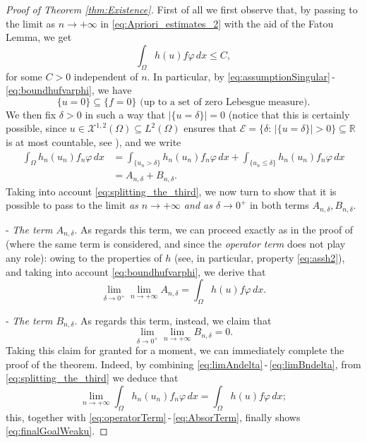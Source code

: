 \documentclass[11pt,a4paper]{amsart}
\theoremstyle{definition}
\theoremstyle{plain}
\numberwithin{equation}{section}
\begin{document}
{\begin{proof}[Proof of Theorem \ref{thm:Existence}]
First of all we first observe that, 
by passing to the limit as $n\to+\infty$ 
in \eqref{eq:Apriori_estimates_2} with the aid of the
Fatou Lemma, we get
\begin{equation} \label{eq:boundhufvarphi}
 \int_{\Omega} h(u)f\varphi\,dx \leq C,
\end{equation}
for some $C > 0$ independent of $n$. In particular, by
\eqref{eq:assumptionSingular}\,-\,\eqref{eq:boundhufvarphi},
 we have
 \begin{equation} \label{eq:inclusionufzero}
  \text{$\{u = 0\}\subseteq \{f = 0\}$ (up to a set of zero Lebesgue measure)}.
  \end{equation}
 We then fix
 $\delta > 0$ in such a way that $|\{u = \delta\}| = 0$
(notice that this is certainly possible, since $u\in \mathcal{X}^{1,2}(\Omega)\subseteq L^2(\Omega)$ ensures that $\mathcal{E} = \{\delta:\,|\{u = \delta\}| > 0\}\subseteq\mathbb{R}$ is at most countable, see \cite[Lemma 2.8]{MonticelliRW}), and we write
\begin{equation}\label{eq:splitting_the_third}
\begin{split}
\int_{\Omega}h_n(u_n)f_n \varphi\,dx & = \int_{\{u_n > \delta\}} h_n(u_n)f_n \varphi\,dx 
+ \int_{\{u_n \leq \delta\}} h_n(u_n)f_n \varphi\,dx\\
& = A_{n,\delta}+B_{n,\delta}.
\end{split}
\end{equation}
Taking into account \eqref{eq:splitting_the_third}, we now turn to show that it is possible
 to pass to the limit \emph{as $n\to+\infty$ and as $\delta\to 0^+$} in both terms
$A_{n,\delta},B_{n,\delta}$.
\medskip

-\,\,\emph{The term $A_{n,\delta}$}. As regards this term,
we can proceed exactly as in the proof
of \cite[Theorem 3.4]{Oliva} (where the same term is considered,
and since the \emph{operator term} does not play any role): owing to the properties of $h$
(see, in particular, property \eqref{eq:assh2}),
and taking into account \eqref{eq:boundhufvarphi}, we derive that
\begin{equation} \label{eq:limAndelta}
 \lim_{\delta\to 0^+}\lim_{n\to+\infty}A_{n,\delta} =
\int_\Omega h(u)f\varphi\,dx.
\end{equation}

-\,\,\emph{The term $B_{n,\delta}$}. As regards this term, instead, we claim that
\begin{equation} \label{eq:limBndelta}
 \lim_{\delta\to 0^+}\lim_{n\to+\infty}B_{n,\delta} = 0.
 \end{equation}
Taking this claim for granted for a moment, we can immediately complete the proof
of the theorem. Indeed, by combining \eqref{eq:limAndelta}\,-\,\eqref{eq:limBndelta},
from \eqref{eq:splitting_the_third} we deduce that
$$\lim_{n\to+\infty}\int_{\Omega}h_n(u_n)f_n \varphi\,dx 
= \int_\Omega h(u)f\varphi\,dx;$$
this, together with \eqref{eq:operatorTerm}\,-\,\eqref{eq:AbsorTerm}, finally shows \eqref{eq:finalGoalWeaku}.


\end{proof}}
\end{document}
